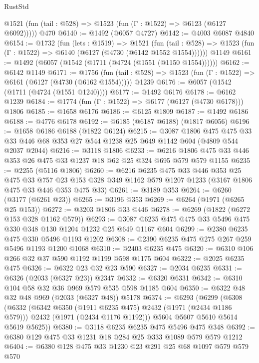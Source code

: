 \begin{lexlean}{RustStd}
\begin{coremodule}
{\begin{coremodule}
{{{{{{{{{{{{{      @1521 (fun (tail : @528) => @1523 (fun (Γ : @1522) => @6123 (@6127 @6092)))))
    @470
@6140 := @1492 (@6057 @4727)
@6142 := @4003 @6087 @4840
@6154 := @1732
    (fun (lets : @1519) =>
    @1521
      (fun (tail : @528) => @1523 (fun (Γ : @1522) => @6140 (@6127 (@4730 (@6142 @1552 @1554))))))
    @1149
@6161 := @1492 (@6057 (@1542 (@1711 (@4724 (@1551 (@1150 @1554))))))
@6162 := @6142 @1149
@6171 := @1756
    (fun (tail : @528) => @1523 (fun (Γ : @1522) => @6161 (@6127 (@4730 (@6162 @1554)))))
    @1239
@6176 := @6057 (@1542 (@1711 (@4724 (@1551 @1240))))
@6177 := @1492 @6176
@6178 := @6162 @1239
@6184 := @1774 (fun (Γ : @1522) => @6177 (@6127 (@4730 @6178))) @1806
@6185 := @1658 @6176
@6186 := @6125 @1809
@6187 := @1492 @6186
@6188 := @4776 @6178
@6192 := @6185 (@6187 @6188) (@1817 @6056)
@6196 := @1658 @6186 @6188 (@1822 @6124)
@6215 := @3087
    @1806
    @475
    @475
    @33
    @33
    @446
    @68
    @353
    @27
    @544
    @1238
    @25
    @649
    @1142
    @604
    (@4809 @544 @2037 @2044)
@6216 := @3118 @1806
@6233 := @6216 @1806 @475 @33 @446 @353 @26 @475 @33 @1237 @18 @62 @25 @324 @695 @579 @579 @1155
@6235 := @2255 (@5116 @1806)
@6260 := @6216
    @6235
    @475
    @33
    @446
    @353
    @25
    @475
    @33
    @757
    @23
    @153
    @328
    @349
    @1162
    @579
    @1207
    @1233
    (@3167 @1806 @475 @33 @446 @353 @475 @33)
@6261 := @3189 @353
@6264 := @6260 (@3177 (@6261 @23))
@6265 := @3196 @353
@6269 := @6264 (@1971 (@6265 @25 @153))
@6272 := @3203 @1806 @33 @446
@6278 := @6269 (@1822 (@6272 @153 @328 @1162 @579))
@6293 := @3087 @6235 @475 @475 @33 @5496 @475 @330 @348 @130 @1204 @1232 @25 @649 @1167 @604
@6299 := @2380 @6235 @475 @330 @5496 @1193 @1202
@6308 := @2390 @6235 @475 @275 @267 @259 @5496 @1193 @1200 @1068
@6310 := @2403 @6235 @475
@6320 := @6310 @106 @266 @32 @37 @590 @1192 @1199 @598 @1175 @604
@6322 := @2025 @6235 @475
@6326 := @6322 @23 @32 @23 @590
@6327 := @2034 @6235
@6331 := @6326 (@2033 (@6327 @23)) @2347
@6332 := @6320 @6331
@6342 := @6310 @104 @58 @32 @36 @969 @579 @535 @598 @1185 @604
@6350 := @6322 @48 @32 @48 @969 (@2033 (@6327 @48)) @5178
@6374 := @6293
    (@6299
      (@6308
        (@6332
          (@6342 @6350 (@1911 @6235 @475) @2432 (@1971 (@2434 @1186 @579)))
          @2432
          (@1971 (@2434 @1176 @1192)))
        @5604
        @5607
        @5610
        @5614
        @5619
        @5625))
@6380 := @3118 @6235 @6235 @475 @5496 @475 @348
@6392 := @6380 @129 @475 @33 @1231 @18 @284 @25 @333 @1089 @579 @579 @1212
@6404 := @6380 @128 @475 @33 @1230 @23 @291 @25 @68 @1097 @579 @579 @570
}}}}}}}}}}}}}
\end{coremodule}}
\end{coremodule}
\end{lexlean}
